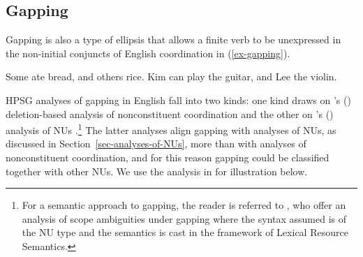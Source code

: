 \documentclass[output=paper
	        ,collection
	        ,collectionchapter
 	        ,biblatex
                ,babelshorthands
                ,newtxmath
                ,draftmode
                ,colorlinks, citecolor=brown
]{langscibook}
\begin{document}
{%
%
%
%

%
%
%
%
%
%
%
%
%
%
%
%
%



\subsection{Gapping}

Gapping is also a type of ellipsis that allows a finite
verb to be unexpressed in the non-initial conjuncts of English coordination in (\ref{ex-gapping}).

\eal
\label{ex-gapping}
\ex Some ate bread, and others rice.\label{g1}
\ex Kim can play the guitar, and Lee the violin.\label{g2}
\zl
%
%
%
%

HPSG analyses of gapping in English fall into two kinds: one kind draws on \citeauthor{Beavers2004}'s (\citeyear{Beavers2004}) deletion-based analysis of nonconstituent coordination \citep{Chaves2009} and the other on \citeauthor{Ginzburg:Sag:2000}'s (\citeyear{Ginzburg:Sag:2000}) analysis of NUs \citep{Abeille2014}.\footnote{For a semantic approach to gapping, the reader is referred to \citet{Park2018}, who offer an analysis of scope ambiguities under gapping where the syntax assumed is of the NU type and the semantics is cast in the framework of Lexical Resource Semantics.} The latter analyses align gapping with analyses of NUs, as discussed in Section~\ref{sec-analyses-of-NUs}, more than with analyses of nonconstituent coordination, and for this reason gapping could be classified together with other NUs. We use the analysis in \citet{Abeille2014} for illustration below.


}
\end{document}
